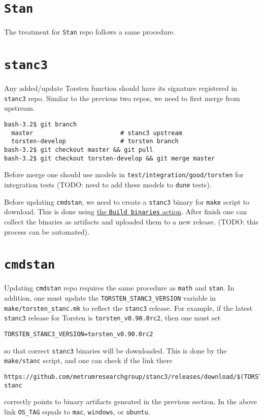 \documentclass[12pt, reqno, oneside]{amsbook}
\numberwithin{equation}{chapter}
\numberwithin{figure}{chapter}
\numberwithin{table}{chapter}
\theoremstyle{remark}
\begin{document}
\section{\texttt{Stan}}
\label{sec:orgaac0db9}
The treatment for \texttt{Stan} repo follows a same procedure.

\section{\texttt{stanc3}}
\label{sec:orgb6072a8}
Any added/update Torsten function should have its signature registered
in \texttt{stanc3} repo. Similar to the previous two repos, we need to first
merge from upstream.
\begin{verbatim}
bash-3.2$ git branch
  master                        # stanc3 upstream
  torsten-develop               # torsten branch
bash-3.2$ git checkout master && git pull
bash-3.2$ git checkout torsten-develop && git merge master
\end{verbatim}
Before merge one should use models in \texttt{test/integration/good/torsten}
for integration tests (TODO: need to add these models to \texttt{dune} tests).

Before updating \texttt{cmdstan}, we need to create a \texttt{stanc3} binary for
\texttt{make} script to download. This is done using \href{https://github.com/metrumresearchgroup/stanc3/actions}{the \texttt{Build binaries}
action}. After finish one can collect the binaries as artifacts and
uploaded them to a new release. (TODO: this process can be automated).


\section{\texttt{cmdstan}}
\label{sec:orgb3dd27a}
Updating \texttt{cmdstan} repo requires the same procedure as \texttt{math} and
\texttt{stan}. In addition, one must update the \texttt{TORSTEN\_STANC3\_VERSION}
variable in \texttt{make/torsten\_stanc.mk} to reflect the \texttt{stanc3}
release. For example, if the latest \texttt{stanc3} release for Torsten is
\texttt{torsten\_v0.90.0rc2}, then one must set
\begin{verbatim}
TORSTEN_STANC3_VERSION=torsten_v0.90.0rc2
\end{verbatim}
so that correct \texttt{stanc3} binaries will be downloaded. This is done by
the \texttt{make/stanc} script, and one can check if the link there
\begin{verbatim}
https://github.com/metrumresearchgroup/stanc3/releases/download/$(TORSTEN_STANC3_VERSION)/$(OS_TAG)-stanc
\end{verbatim}
correctly points to binary artifacts geneated in the previous
section. In the above link \texttt{OS\_TAG} equals to \texttt{mac}, \texttt{windows}, or
\texttt{ubuntu}.
\end{document}

